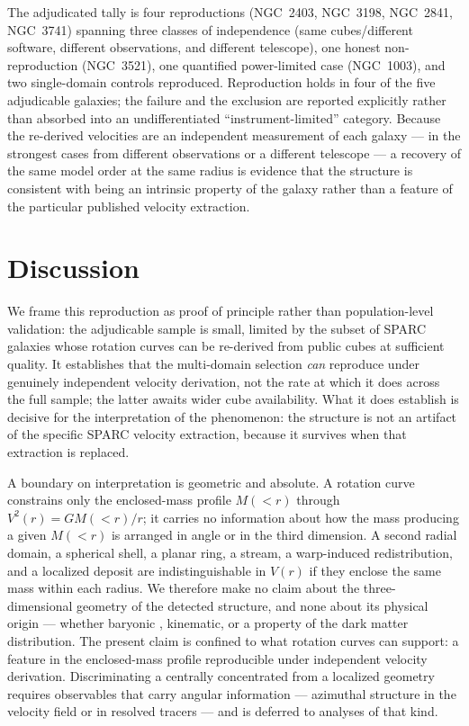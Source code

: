\documentclass[twocolumn]{aastex701}
\begin{document}
The adjudicated tally is four reproductions (NGC~2403, NGC~3198, NGC~2841,
NGC~3741) spanning three classes of independence (same cubes/different software,
different observations, and different telescope), one honest non-reproduction
(NGC~3521), one quantified power-limited case (NGC~1003), and two single-domain
controls reproduced. Reproduction holds in four of the five adjudicable galaxies;
the failure and the exclusion are reported explicitly rather than absorbed into an
undifferentiated ``instrument-limited'' category. Because the re-derived
velocities are an independent measurement of each galaxy --- in the strongest
cases from different observations or a different telescope --- a recovery of the
same model order at the same radius is evidence that the structure is consistent with being an intrinsic property of the
galaxy rather than a feature of the particular published velocity extraction.

\section{Discussion} \label{sec:discussion}

We frame this reproduction as proof of principle rather than population-level
validation: the adjudicable sample is small, limited by the subset of SPARC
galaxies whose rotation curves can be re-derived from public cubes at sufficient
quality. It establishes that the multi-domain selection \emph{can} reproduce under
genuinely independent velocity derivation, not the rate at which it does across
the full sample; the latter awaits wider cube availability. What it does establish
is decisive for the interpretation of the phenomenon: the structure is not an
artifact of the specific SPARC velocity extraction, because it survives when that
extraction is replaced.

A boundary on interpretation is geometric and absolute. A rotation curve
constrains only the enclosed-mass profile $M({<}r)$ through $V^2(r) = G
M({<}r)/r$; it carries no information about how the mass producing a given
$M({<}r)$ is arranged in angle or in the third dimension. A second radial domain,
a spherical shell, a planar ring, a stream, a warp-induced redistribution, and a
localized deposit are indistinguishable in $V(r)$ if they enclose the same mass
within each radius. We therefore make no claim about the three-dimensional
geometry of the detected structure, and none about its physical origin --- whether
baryonic \citep[e.g.\ features propagated from the gas disk;][]{Sancisi2004},
kinematic, or a property of the dark matter distribution. The present claim is
confined to what rotation curves can support: a feature in the enclosed-mass profile
reproducible under independent velocity derivation. Discriminating a centrally concentrated from
a localized geometry requires observables that carry angular information ---
azimuthal structure in the velocity field or in resolved tracers --- and is
deferred to analyses of that kind.
\end{document}
